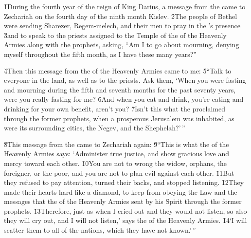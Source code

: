 \v{1}During the fourth year of the reign of King Darius, a message from the  came to Zechariah on the fourth day of the ninth month Kislev. \v{2}The people of Bethel were sending Sharezer, Regem-melech, and their men to pray in the 's presence \v{3}and to speak to the priests assigned to the Temple of the  of the Heavenly Armies along with the prophets, asking, ``Am I to go about mourning, denying myself throughout the fifth month, as I have these many years?''

\v{4}Then this message from the  of the Heavenly Armies came to me: \v{5}``Talk to everyone in the land, as well as to the priests. Ask them, `When you were fasting and mourning during the fifth and seventh months for the past seventy years, were you really fasting for me? \v{6}And when you eat and drink, you're eating and drinking for your own benefit, aren't you? \v{7}Isn't this what the  proclaimed through the former prophets, when a prosperous Jerusalem was inhabited, as were its surrounding cities, the Negev, and the Shephelah?'\,''

\v{8}This message from the  came to Zechariah again: \v{9}``This is what the  of the Heavenly Armies says: `Administer true justice, and show gracious love and mercy toward each other. \v{10}You are not to wrong the widow, orphans, the foreigner, or the poor, and you are not to plan evil against each other. \v{11}But they refused to pay attention, turned their backs, and stopped listening. \v{12}They made their hearts hard like a diamond, to keep from obeying the Law and the messages that the  of the Heavenly Armies sent by his Spirit through the former prophets. \v{13}Therefore, just as when I cried out and they would not listen, so also they will cry out, and I will not listen,' says the  of the Heavenly Armies. \v{14}`I will scatter them to all of the nations, which they have not known.'\,''

